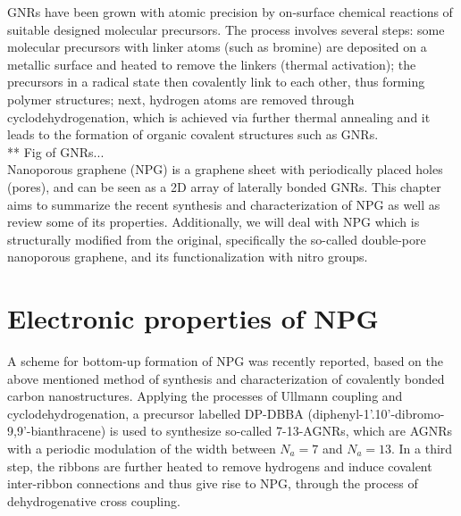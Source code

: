 GNRs have been grown with atomic precision by on-surface chemical reactions of suitable
designed molecular precursors\parencite{Cai2010, Kretz2018}. The process involves several steps\parencite{Grill2007, Cai2010}: some molecular precursors with linker atoms (such as bromine) are deposited on a metallic surface and  heated to remove the linkers (thermal activation); the precursors in a radical state then covalently link to each other, thus forming polymer structures; next, hydrogen atoms are removed through cyclodehydrogenation, which is achieved via further thermal annealing and it leads to the formation of organic covalent structures such as GNRs.\\

** Fig of GNRs...\\

Nanoporous graphene (NPG) is a graphene sheet with periodically placed holes (pores), and can be seen as a 2D array of laterally bonded GNRs. This chapter aims to summarize the recent synthesis and characterization\parencite{Moreno2018} of NPG as well as review some of its properties. Additionally, we will deal with NPG which is structurally modified from the original, specifically the so-called double-pore nanoporous graphene, and its functionalization with nitro groups.


\section{Electronic properties of NPG}\label{ele-npg}

A scheme for bottom-up formation of NPG was recently reported\parencite{Moreno2018, Kretz2018}, based on the above mentioned method of synthesis and characterization of covalently bonded carbon nanostructures.
Applying the processes of Ullmann coupling and cyclodehydrogenation, a precursor labelled DP-DBBA (diphenyl-1'.10'-dibromo-9,9'-bianthracene) is used to synthesize so-called 7-13-AGNRs, which are AGNRs with a periodic modulation of the width between \(N_a=7\) and \(N_a=13\). In a third step, the ribbons are further heated to remove hydrogens and induce covalent inter-ribbon connections and thus give rise to NPG, through the process of dehydrogenative cross coupling.\\

